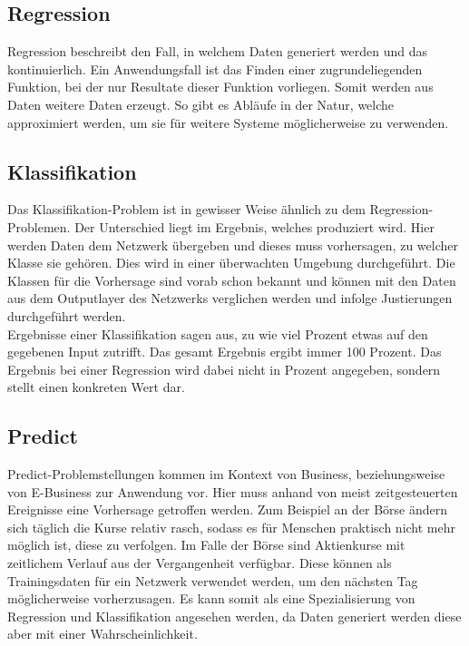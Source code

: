 \subsection{Regression}
\label{subsec:Regression}

Regression beschreibt den Fall, in welchem Daten generiert werden und das kontinuierlich.
Ein Anwendungsfall ist das Finden einer zugrundeliegenden Funktion, bei der nur Resultate dieser Funktion vorliegen. 
Somit werden aus Daten weitere Daten erzeugt.
So gibt es Abläufe in der Natur, welche approximiert werden, um sie für weitere Systeme möglicherweise zu verwenden. \cite{bishop2006pattern}

\subsection{Klassifikation}
\label{subsec:Classification}

Das Klassifikation-Problem ist in gewisser Weise ähnlich zu dem Regression-Problemen. 
Der Unterschied liegt im Ergebnis, welches produziert wird.  
Hier werden Daten dem Netzwerk übergeben und dieses muss vorhersagen, zu welcher Klasse sie gehören. Dies wird in einer überwachten Umgebung durchgeführt. 
Die Klassen für die Vorhersage sind vorab schon bekannt und können mit den Daten aus dem Outputlayer des Netzwerks verglichen werden und infolge Justierungen durchgeführt werden. \cite{AI3} \\

\noindent
Ergebnisse einer Klassifikation sagen aus, zu wie viel Prozent etwas auf den gegebenen Input zutrifft. 
Das gesamt Ergebnis ergibt immer 100 Prozent. 
Das Ergebnis bei einer Regression wird dabei nicht in Prozent angegeben, sondern stellt einen konkreten Wert dar.

\subsection{Predict}
\label{subsec:Predict}

Predict-Problemstellungen kommen im Kontext von Business, beziehungsweise von E-Business zur Anwendung vor. 
Hier muss anhand von meist zeitgesteuerten Ereignisse eine Vorhersage getroffen werden. 
Zum Beispiel an der Börse ändern sich täglich die Kurse relativ rasch, sodass es für Menschen praktisch nicht mehr möglich ist, diese zu verfolgen. 
Im Falle der Börse sind Aktienkurse mit zeitlichem Verlauf aus der Vergangenheit verfügbar. 
Diese können als Trainingsdaten für ein Netzwerk verwendet werden, um den nächsten Tag möglicherweise vorherzusagen. 
Es kann somit als eine Spezialisierung von Regression und Klassifikation angesehen werden, da Daten generiert werden diese aber mit einer Wahrscheinlichkeit.

